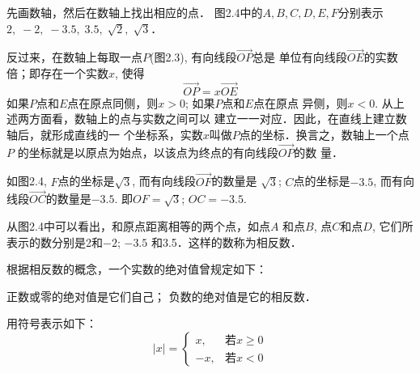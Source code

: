 \begin{solution}
    先画数轴，然后在数轴上找出相应的点．
图2.4中的$A,B,C,D,E,F$分别表示$2,\; -2,\; -3.5,\; 
3.5,\; \sqrt{2},\; \sqrt{3}$．

\begin{figure}[htp]
    \centering
{}
    \caption{}
\end{figure}
\end{solution}


反过来，在数轴上每取一点$P$(图2.3), 有向线段$\Vec{OP}$总是
单位有向线段$\Vec{OE}$的实数倍；即存在一个实数$x$, 使得
\[\Vec{OP}=x\Vec{OE} \]
如果$P$点和$E$点在原点同侧，则$x>0$; 如果$P$点和$E$点在原点
异侧，则$x<0$. 从上述两方面看，数轴上的点与实数之间可以
建立一一对应．因此，在直线上建立数轴后，就形成直线的一
个坐标系，实数$x$叫做$P$点的坐标．换言之，数轴上一个点$P$
的坐标就是以原点为始点，以该点为终点的有向线段$\Vec{OP}$的数
量．

如图2.4, $F$点的坐标是$\sqrt{3}$, 而有向线段$\Vec{OF}$的数量是
$\sqrt{3}$; $C$点的坐标是$-3.5$, 而有向线段$\Vec{OC}$的数量是$-3.5$. 即$OF=\sqrt{3}$; $OC=-3.5$.

从图2.4中可以看出，和原点距离相等的两个点，如点$A$
和点$B$, 点$C$和点$D$, 它们所表示的数分别是2和$-2$; $-3.5$
和3.5．这样的数称为相反数．

根据相反数的概念，一个实数的绝对值曾规定如下：
\begin{blk}{}
    正数或零的绝对值是它们自己；
负数的绝对值是它的相反数．
\end{blk}

用符号表示如下：
\[|x|=\begin{cases}
    x, & \text{若}x\ge 0\\
    -x, & \text{若}x<0
\end{cases}\]

